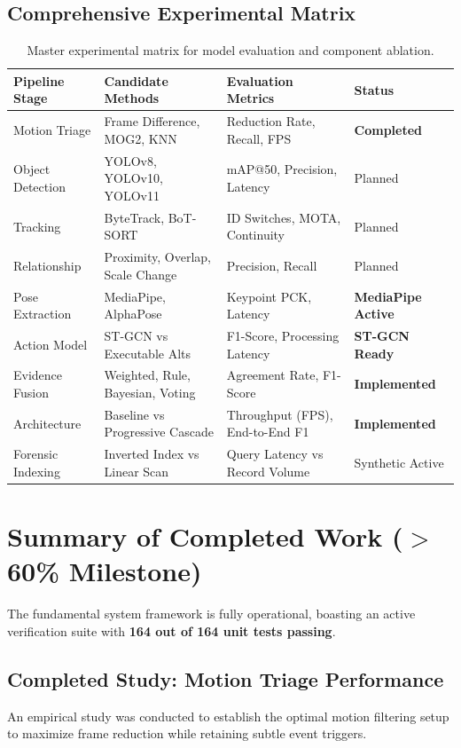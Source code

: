 \documentclass[11pt, a4paper]{article}
\begin{document}
\subsection{Comprehensive Experimental Matrix}
\begin{table}[H]
\centering
\scriptsize
\renewcommand{\arraystretch}{1.25}
\begin{tabularx}{\textwidth}{|>{\hsize=0.18\hsize}X|>{\hsize=0.32\hsize}X|>{\hsize=0.32\hsize}X|>{\hsize=0.18\hsize}X|}
\hline
\textbf{Pipeline Stage} & \textbf{Candidate Methods} & \textbf{Evaluation Metrics} & \textbf{Status} \\
\hline
Motion Triage & Frame Difference, MOG2, KNN & Reduction Rate, Recall, FPS & \textbf{Completed} \\
\hline
Object Detection & YOLOv8, YOLOv10, YOLOv11 & mAP@50, Precision, Latency & Planned \\
\hline
Tracking & ByteTrack, BoT-SORT & ID Switches, MOTA, Continuity & Planned \\
\hline
Relationship & Proximity, Overlap, Scale Change & Precision, Recall & Planned \\
\hline
Pose Extraction & MediaPipe, AlphaPose & Keypoint PCK, Latency & \textbf{MediaPipe Active} \\
\hline
Action Model & ST-GCN vs Executable Alts & F1-Score, Processing Latency & \textbf{ST-GCN Ready} \\
\hline
Evidence Fusion & Weighted, Rule, Bayesian, Voting & Agreement Rate, F1-Score & \textbf{Implemented} \\
\hline
Architecture & Baseline vs Progressive Cascade & Throughput (FPS), End-to-End F1 & \textbf{Implemented} \\
\hline
Forensic Indexing & Inverted Index vs Linear Scan & Query Latency vs Record Volume & Synthetic Active \\
\hline
\end{tabularx}
\caption{Master experimental matrix for model evaluation and component ablation.}
\end{table}

\section{Summary of Completed Work ($>$60\% Milestone)}

The fundamental system framework is fully operational, boasting an active verification suite with \textbf{164 out of 164 unit tests passing}.

\subsection{Completed Study: Motion Triage Performance}
An empirical study was conducted to establish the optimal motion filtering setup to maximize frame reduction while retaining subtle event triggers.
\end{document}
